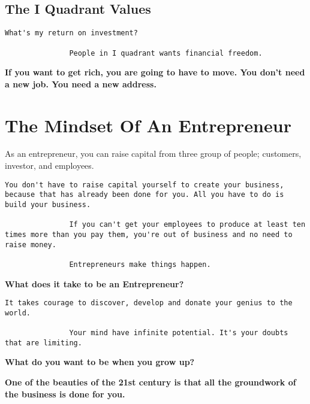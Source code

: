 \documentclass[a4paper, 12pt]{report}
\begin{document}
    \section{The I Quadrant Values}
    \begin{lstlisting}[style=latexFrameTB]
               What's my return on investment?
               
               People in I quadrant wants financial freedom.
    \end{lstlisting}
    
    \begin{note}\textbf{If you want to get rich, you are going to have to move. You don't need a new job. You need a new address.}
    \end{note}
    
    \chapter{The Mindset Of An Entrepreneur}
    As an entrepreneur, you can raise capital from three group of people; customers, investor, and employees.
    \begin{lstlisting}[style=latexFrameTB]
               You don't have to raise capital yourself to create your business, because that has already been done for you. All you have to do is build your business.
               
               If you can't get your employees to produce at least ten times more than you pay them, you're out of business and no need to raise money.
               
               Entrepreneurs make things happen.
    \end{lstlisting}
    \begin{framedquest*}
       \textbf{What does it take to be an Entrepreneur?}
    \end{framedquest*}
    \begin{lstlisting}[style=latexFrameTB]
               It takes courage to discover, develop and donate your genius to the world.
               
               Your mind have infinite potential. It's your doubts that are limiting.
    \end{lstlisting}
    \begin{framedquest*}
       \textbf{What do you want to be when you grow up?}
    \end{framedquest*}
    \begin{note}\textbf{One of the beauties of the 21st century is that all the groundwork of the business is done for you.}
    \end{note}
    
\end{document}
